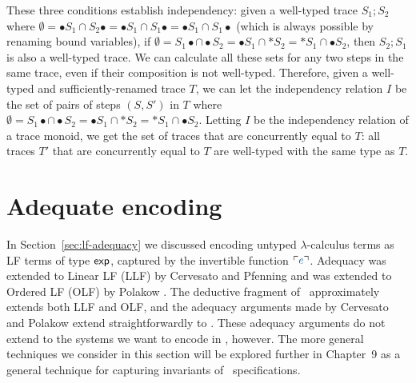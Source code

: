 These three conditions establish independency: given a well-typed
trace $S_1; S_2$ where $\emptyset = {\bullet}S_1 \cap S_2{\bullet} =
{\bullet}S_1 \cap S_1{\bullet} = {\bullet}S_1 \cap S_1{\bullet}$
(which is always possible by renaming bound variables), if $\emptyset
= S_1{\bullet} \cap {\bullet}S_2 = {\bullet}S_1 \cap {\ast}S_2 =
{\ast}S_1 \cap {\bullet}S_2$, then $S_2; S_1$ is also a well-typed
trace.  We can calculate all these sets for any two steps in the same
trace, even if their composition is not well-typed. Therefore, given a
well-typed and sufficiently-renamed trace $T$, we can let the
independency relation $I$ be the set of pairs of steps $(S, S')$ in
$T$ where $\emptyset = S_1{\bullet} \cap {\bullet}S_2 = {\bullet}S_1
\cap {\ast}S_2 = {\ast}S_1 \cap {\bullet}S_2$. Letting $I$ be the
independency relation of a trace monoid, we get the set of traces that
are concurrently equal to $T$: all traces $T'$ that are concurrently
equal to $T$ are well-typed with the same type as $T$.

\section{Adequate encoding}
\label{sec:sls-adequate}

In Section~\ref{sec:lf-adequacy} we discussed encoding untyped
$\lambda$-calculus terms as LF terms of type ${\sf exp}$, captured by
the invertible function $\interp{e}$. Adequacy was extended to Linear
LF (LLF) by Cervesato and Pfenning \cite{cervesato02linear} and was
extended to Ordered LF (OLF) by Polakow \cite{polakow01ordered}. The
deductive fragment of \sls~approximately extends both LLF and OLF, and
the adequacy arguments made by Cervesato and Polakow extend
straightforwardly to \sls. These adequacy arguments do not extend to
the systems we want to encode in \sls, however. The more general
techniques we consider in this section will be explored further in
Chapter~9 as a general technique for capturing invariants of
\sls~specifications.


